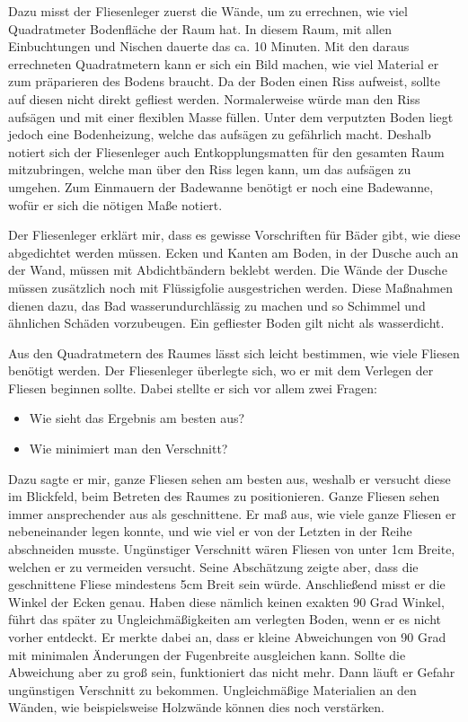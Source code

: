 Dazu misst der Fliesenleger zuerst die Wände, um zu errechnen, wie viel Quadratmeter Bodenfläche der Raum hat. In diesem Raum, mit allen Einbuchtungen und Nischen dauerte das ca. 10 Minuten. Mit den daraus errechneten Quadratmetern kann er sich ein Bild machen, wie viel Material er zum präparieren des Bodens braucht. Da der Boden einen Riss aufweist, sollte auf diesen nicht direkt gefliest werden. Normalerweise würde man den Riss aufsägen und mit einer flexiblen Masse füllen. Unter dem verputzten Boden liegt jedoch eine Bodenheizung, welche das aufsägen zu gefährlich macht. Deshalb notiert sich der Fliesenleger auch Entkopplungsmatten für den gesamten Raum mitzubringen, welche man über den Riss legen kann, um das aufsägen zu umgehen. Zum Einmauern der Badewanne benötigt er noch eine Badewanne, wofür er sich die nötigen Maße notiert.

Der Fliesenleger erklärt mir, dass es gewisse Vorschriften für Bäder gibt, wie diese abgedichtet werden müssen. Ecken und Kanten am Boden, in der Dusche auch an der Wand, müssen mit Abdichtbändern beklebt werden. Die Wände der Dusche müssen zusätzlich noch mit Flüssigfolie ausgestrichen werden. Diese Maßnahmen dienen dazu, das Bad wasserundurchlässig zu machen und so Schimmel und ähnlichen Schäden vorzubeugen. Ein gefliester Boden gilt nicht als wasserdicht.

Aus den Quadratmetern des Raumes lässt sich leicht bestimmen, wie viele Fliesen benötigt werden. Der Fliesenleger überlegte sich, wo er mit dem Verlegen der Fliesen beginnen sollte. Dabei stellte er sich vor allem zwei Fragen:

\begin{itemize}
	\item Wie sieht das Ergebnis am besten aus?
	\item Wie minimiert man den Verschnitt?
\end{itemize}

Dazu sagte er mir, ganze Fliesen sehen am besten aus, weshalb er versucht diese im Blickfeld, beim Betreten des Raumes zu positionieren. Ganze Fliesen sehen immer ansprechender aus als geschnittene. Er maß aus, wie viele ganze Fliesen er nebeneinander legen konnte, und wie viel er von der Letzten in der Reihe abschneiden musste. Ungünstiger Verschnitt wären Fliesen von unter 1cm Breite, welchen er zu vermeiden versucht. Seine Abschätzung zeigte aber, dass die geschnittene Fliese mindestens 5cm Breit sein würde. Anschließend misst er die Winkel der Ecken genau. Haben diese nämlich keinen exakten 90 Grad Winkel, führt das später zu Ungleichmäßigkeiten am verlegten Boden, wenn er es nicht vorher entdeckt. Er merkte dabei an, dass er kleine Abweichungen von 90 Grad mit minimalen Änderungen der Fugenbreite ausgleichen kann. Sollte die Abweichung aber zu groß sein, funktioniert das nicht mehr. Dann läuft er Gefahr ungünstigen Verschnitt zu bekommen. Ungleichmäßige Materialien an den Wänden, wie beispielsweise Holzwände können dies noch verstärken.

